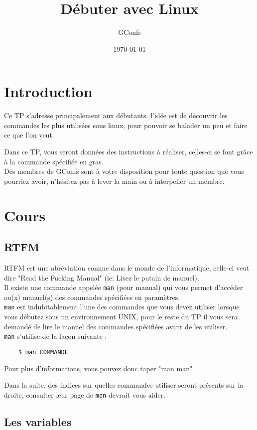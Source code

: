 \documentclass{article}
\title{Débuter avec Linux}
\author{GConfs}
\date{\today}
\begin{document}
\maketitle

\section{Introduction}
Ce TP s'adresse principalement aux débutants. l'idée est de découvrir les commandes les plus utilisées sous linux, pour pouvoir se balader un peu et faire ce que l'on veut.

Dans ce TP, vous seront données des instructions à réaliser, celles-ci se font grâce à la commande spécifiée en gras.\\
Des membres de GConfs sont à votre disposition pour toute question que vous pourriez avoir, n'hésitez pas à lever la main ou à interpeller un membre.


\section{Cours}

\subsection{RTFM}
RTFM est une abréviation connue dans le monde de l'informatique, celle-ci veut dire "Read the Fucking Manual" (ie: Lisez le putain de manuel).\\
Il existe une commande appelée \texttt{man} (pour manual) qui vous permet d'accéder au(x) manuel(s) des commandes spécifiées en paramètres.\\

\texttt{man} est indubitablement l'une des commandes que vous devez utiliser lorsque vous débutez sous un environnement UNIX, pour le reste du TP il vous sera demandé de lire le manuel des commandes spécifiées avant de les utiliser.\\

\texttt{man} s'utilise de la façon suivante :
\begin{verbatim}
    $ man COMMANDE
\end{verbatim}
Pour plus d'informations, vous pouvez donc taper "man man"

Dans la suite, des indices sur quelles commandes utiliser seront présents sur la droite, consulter leur page de \texttt{man} devrait vous aider.

\subsection{Les variables}
\end{document}
